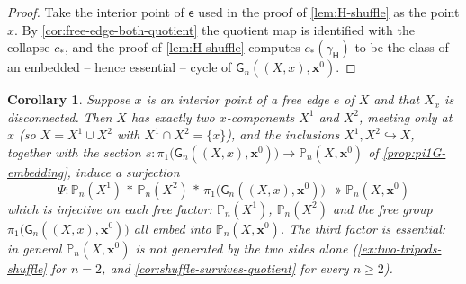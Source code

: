 \documentclass[reqno]{amsart}
\newtheorem{corollary}[theorem]{Corollary}
\theoremstyle{definition}
\newcommand\bfx{\mathbf{x}}
\newcommand\sfG{\mathsf{G}}
\newcommand\sfH{\mathsf{H}}
\newcommand\sfe{\mathsf{e}}
\newcommand{\PB}{\mathbb{P}}
\newcommand{\base}{\bfx^0}
\numberwithin{equation}{section}
\begin{document}
\begin{proof}
Take the interior point of \(\sfe\) used in the proof of
\cref{lem:H-shuffle} as the point \(x\). By
\cref{cor:free-edge-both-quotient} the quotient map is
identified with the collapse \(c_\ast\), and the proof of
\cref{lem:H-shuffle} computes \(c_\ast(\gamma_\sfH)\) to be the
class of an embedded -- hence essential -- cycle of
\(\sfG_n((X,x),\base)\).
\end{proof}

\begin{corollary}\label{cor:free-edge-disconnected}
Suppose \(x\) is an interior point of a free edge \(e\) of \(X\) and that
\(X_x\) is disconnected. Then \(X\) has exactly two \(x\)-components
\(X^1\) and \(X^2\), meeting only at \(x\) (so \(X=X^1\cup X^2\) with
\(X^1\cap X^2=\{x\}\)), and the inclusions \(X^1,X^2\hookrightarrow X\),
together with the section
\(s\colon\pi_1\bigl(\sfG_n((X,x),\base)\bigr)\to\PB_n(X,\base)\) of
\cref{prop:pi1G-embedding}, induce a surjection
\[
\Psi\colon\PB_n(X^1)\,\ast\,\PB_n(X^2)\,\ast\,
\pi_1\bigl(\sfG_n((X,x),\base)\bigr)
\twoheadrightarrow\PB_n(X,\base)
\]
which is injective on each free factor: \(\PB_n(X^1)\),
\(\PB_n(X^2)\) and the free group
\(\pi_1\bigl(\sfG_n((X,x),\base)\bigr)\) all embed into
\(\PB_n(X,\base)\). The third factor is essential: in general
\(\PB_n(X,\base)\) is \emph{not} generated by the two sides alone
(\cref{ex:two-tripods-shuffle} for \(n=2\), and
\cref{cor:shuffle-survives-quotient} for every \(n\geq2\)).
\end{corollary}
\end{document}
